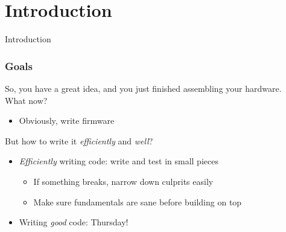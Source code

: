 \documentclass{beamer}
\begin{document}
\begin{frame}
\titlepage

\setcounter{tocdepth}{1}
\tableofcontents
\end{frame}

\section{Introduction} %
\begin{frame}
\centering \huge Introduction
\end{frame}

\begin{frame}
\frametitle{Goals}
So, you have a great idea, and you just finished assembling your hardware. \\
What now?
 {
\begin{itemize}
  \item Obviously, write firmware
\end{itemize}
\hfill\break
But how to write it \textit{efficiently} and \textit{well}?
}
 {
\begin{itemize}
  \item \textit{Efficiently} writing code: write and test in small pieces
  \begin{itemize}
    \item If something breaks, narrow down culprits easily
    \item Make sure fundamentals are sane before building on top
  \end{itemize}
  \item Writing \textit{good} code: Thursday!
\end{itemize}
}
\end{frame}
\end{document}
